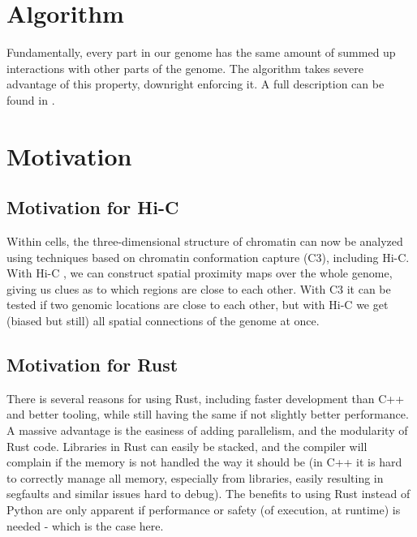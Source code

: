 


\section{Algorithm}\label{sec:algorithm}


Fundamentally, every part in our genome has the same amount of summed up
interactions with other parts of the genome. The algorithm takes severe
advantage of this property, downright enforcing it. A full description can be
found in .



\section{Motivation}\label{sec:motivation}

\subsection{Motivation for Hi-C}

Within cells, the three-dimensional structure of chromatin can now be analyzed
using techniques based on chromatin conformation capture (C3), including Hi-C.
With Hi-C , we can construct spatial proximity
maps over the whole genome, giving us clues as to which regions are close to
each other. With C3 it can be tested if two genomic locations are close to each
other, but with Hi-C we get (biased but still) all spatial connections of the
genome at once.

\subsection{Motivation for Rust}

There is several reasons for using Rust, including faster development than C++
and better tooling, while still having the same if not slightly better
performance. A massive advantage is the easiness of adding parallelism, and the
modularity of Rust code. Libraries in Rust can easily be stacked, and the
compiler will complain if the memory is not handled the way it should be (in
C++ it is hard to correctly manage all memory, especially from libraries,
easily resulting in segfaults and similar issues hard to debug). The benefits to
using Rust instead of Python are only apparent if performance or safety (of
execution, at runtime) is needed - which is the case here.




